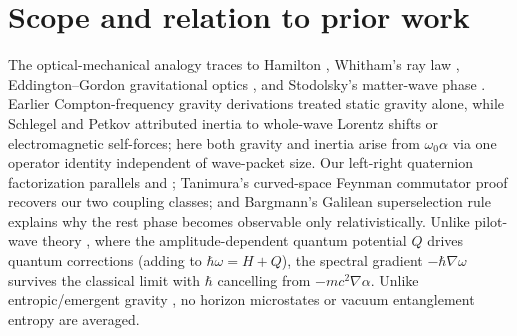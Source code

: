 \documentclass[aps,prd,onecolumn,tightenlines,nofootinbib,notitlepage,10pt,floatfix]{revtex4-2}
\theoremstyle{indentedtheorem}
\begin{document}
\section{Scope and relation to prior work}
\label{sec:scope}

The optical-mechanical analogy traces to Hamilton \citep{Synge1937Geometrical,Evans1996Optical}, Whitham's ray law \citep{Whitham1974Linear}, Eddington--Gordon gravitational optics \citep{Eddington1920,Gordon1923Refraction}, and Stodolsky's matter-wave phase \citep{Stodolsky1979Matter,Greenberger1979Coherence}. Earlier Compton-frequency gravity derivations \citep{Evans2001Matter,Wootters2003Why,Mueller2014Quantum,Xu2019DeBroglie,Czarnecki2021Gravitational} treated static gravity alone, while Schlegel \citep{Schlegel1954Wave} and Petkov \citep{Petkov1999Acceleration} attributed inertia to whole-wave Lorentz shifts or electromagnetic self-forces; here both gravity and inertia arise from $\omega_0\alpha$ via one operator identity independent of wave-packet size. Our left-right quaternion factorization parallels \citet{Hestenes1990Zitterbewegung} and \citet{LasenbyDoranGull1998Gravity}; Tanimura's curved-space Feynman commutator proof \citep{Tanimura1992Relativistic} recovers our two coupling classes; and Bargmann's Galilean superselection rule \citep{Bargmann1954Unitary} explains why the rest phase becomes observable only relativistically. Unlike pilot-wave theory \citep{deBroglie1927Wave,Bohm1952Suggested,Bohm1952SuggestedB}, where the amplitude-dependent quantum potential $Q$ drives quantum corrections (adding to $\hbar\omega=H+Q$), the spectral gradient $-\hbar\nabla\omega$ survives the classical limit with $\hbar$ cancelling from $-mc^2\nabla\alpha$. Unlike entropic/emergent gravity \citep{Jacobson1995Thermodynamics,Padmanabhan2010Thermodynamics,Verlinde2011Origin,Jacobson2016Entanglement,Verlinde2017Emergent}, no horizon microstates or vacuum entanglement entropy are averaged.
\end{document}
